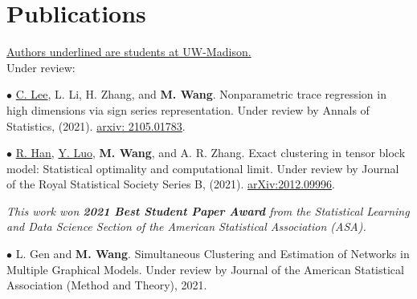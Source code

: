 \documentclass[letterpaper]{article}
\renewenvironment{itemize}{
  \begin{list}{}{
    \setlength{\leftmargin}{1.5em}
  }
}{
  \end{list}
}
\begin{document}
\section*{Publications}

\underline{Authors underlined are students at UW-Madison.}\\

Under review:
\begin{itemize}


\item$\bullet$  \underline{C. Lee}, L. Li, H. Zhang, and {\bf M. Wang}. Nonparametric trace regression in high dimensions via sign series representation. Under review by Annals of Statistics, (2021). \href{https://arxiv.org/abs/2105.01783}{arxiv: 2105.01783}.

\item$\bullet$  \underline{R. Han}, \underline{Y. Luo}, {\bf M. Wang}, and A. R. Zhang. Exact clustering in tensor block model: Statistical optimality and computational limit. Under review by Journal of the Royal Statistical Society Series B, (2021). \href{https://arxiv.org/abs/2012.09996}{arXiv:2012.09996}.

{\it This work won {\bf 2021 Best Student Paper Award} from the Statistical Learning and Data Science Section of the American Statistical Association (ASA).}


\item$\bullet$ L. Gen and {\bf M. Wang}. Simultaneous Clustering and Estimation of Networks in Multiple Graphical Models. Under review by Journal of the American Statistical Association (Method and Theory), 2021. 
\end{itemize}
\end{document}
